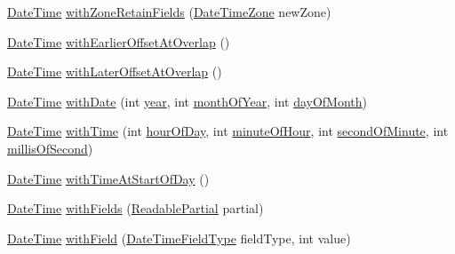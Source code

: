 \begin{DoxyCompactItemize}
\item 
\hyperlink{classorg_1_1joda_1_1time_1_1_date_time}{Date\-Time} \hyperlink{classorg_1_1joda_1_1time_1_1_date_time_a18157feea5b8365060902af3496ad794}{with\-Zone\-Retain\-Fields} (\hyperlink{classorg_1_1joda_1_1time_1_1_date_time_zone}{Date\-Time\-Zone} new\-Zone)
\item 
\hyperlink{classorg_1_1joda_1_1time_1_1_date_time}{Date\-Time} \hyperlink{classorg_1_1joda_1_1time_1_1_date_time_ac46d450264f956763040b32663ab53c9}{with\-Earlier\-Offset\-At\-Overlap} ()
\item 
\hyperlink{classorg_1_1joda_1_1time_1_1_date_time}{Date\-Time} \hyperlink{classorg_1_1joda_1_1time_1_1_date_time_a97fe15d52e1c061ac892b739f68faa6a}{with\-Later\-Offset\-At\-Overlap} ()
\item 
\hyperlink{classorg_1_1joda_1_1time_1_1_date_time}{Date\-Time} \hyperlink{classorg_1_1joda_1_1time_1_1_date_time_a625020b84fb2589450f011f75ea2e1f3}{with\-Date} (int \hyperlink{classorg_1_1joda_1_1time_1_1_date_time_a2fad630c40bee720a815fb4e2a06f133}{year}, int \hyperlink{classorg_1_1joda_1_1time_1_1_date_time_a9119fa14bbe721475778ba261337aa0e}{month\-Of\-Year}, int \hyperlink{classorg_1_1joda_1_1time_1_1_date_time_ae2edf04c8cc742fdfcd838acf53f8751}{day\-Of\-Month})
\item 
\hyperlink{classorg_1_1joda_1_1time_1_1_date_time}{Date\-Time} \hyperlink{classorg_1_1joda_1_1time_1_1_date_time_ac7090833f266e26308f3c133832cb35a}{with\-Time} (int \hyperlink{classorg_1_1joda_1_1time_1_1_date_time_ad4d63b2e220315cf5eb57d3960f65ba5}{hour\-Of\-Day}, int \hyperlink{classorg_1_1joda_1_1time_1_1_date_time_ab9fa72f78065c0a7abb9819505d66ee6}{minute\-Of\-Hour}, int \hyperlink{classorg_1_1joda_1_1time_1_1_date_time_a9dee7bbe22d6f87a9dedc9017be29550}{second\-Of\-Minute}, int \hyperlink{classorg_1_1joda_1_1time_1_1_date_time_adebe1a924958e8d4e127d5b278887eee}{millis\-Of\-Second})
\item 
\hyperlink{classorg_1_1joda_1_1time_1_1_date_time}{Date\-Time} \hyperlink{classorg_1_1joda_1_1time_1_1_date_time_a2ecaf95d5c03da823c2f87157ee39f20}{with\-Time\-At\-Start\-Of\-Day} ()
\item 
\hyperlink{classorg_1_1joda_1_1time_1_1_date_time}{Date\-Time} \hyperlink{classorg_1_1joda_1_1time_1_1_date_time_af2a741c180b2759467bc9e20a73106d4}{with\-Fields} (\hyperlink{interfaceorg_1_1joda_1_1time_1_1_readable_partial}{Readable\-Partial} partial)
\item 
\hyperlink{classorg_1_1joda_1_1time_1_1_date_time}{Date\-Time} \hyperlink{classorg_1_1joda_1_1time_1_1_date_time_a3bd6b5bf7b9551f096e5ad516d8e00b0}{with\-Field} (\hyperlink{classorg_1_1joda_1_1time_1_1_date_time_field_type}{Date\-Time\-Field\-Type} field\-Type, int value)

\end{DoxyCompactItemize}
